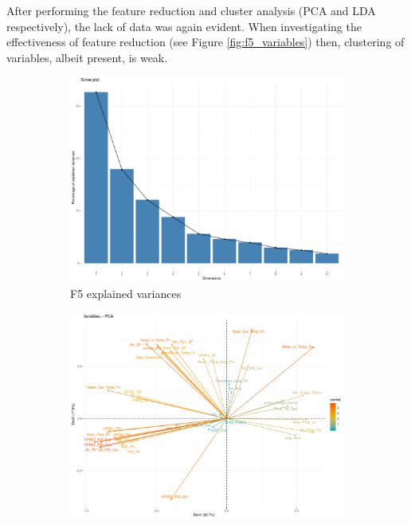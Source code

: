 After performing the feature reduction and cluster analysis (PCA and LDA respectively), the lack of data was again evident. When investigating the effectiveness of feature reduction (see Figure \ref{fig:f5_variables}) then, clustering of variables, albeit present, is weak. 

\begin{figure}[ht!]
    \centering
    \begin{subfigure}{.3\textwidth}
        \centering
        \includegraphics[width=\textwidth]{plots/f5_explained_variances.pdf}        
        \caption{F5 explained variances}
        \label{fig:f5_explained_variances}
    \end{subfigure}%
    \begin{subfigure}{.3\textwidth}
        \centering
        \includegraphics[width=\textwidth]{plots/f5_graph_of_variables.pdf}

\end{subfigure}
\end{figure}
